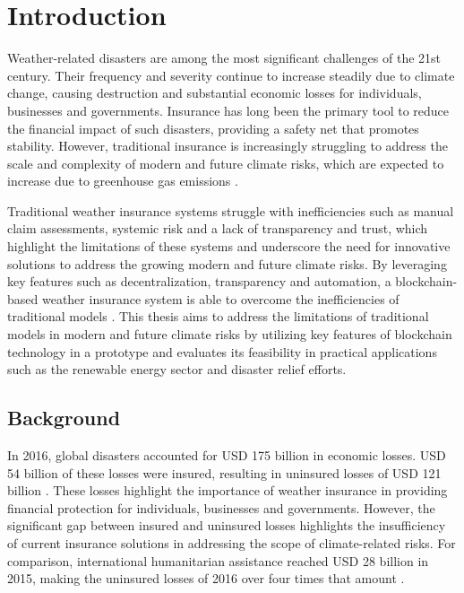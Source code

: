 \chapter{Introduction}\label{chapter:introduction} 
Weather-related disasters are among the most significant challenges of the 21st century. Their frequency and severity continue to increase steadily due to climate change, causing destruction and substantial economic losses for individuals, businesses and governments. Insurance has long been the primary tool to reduce the financial impact of such disasters, providing a safety net that promotes stability. However, traditional insurance is increasingly struggling to address the scale and complexity of modern and future climate risks, which are expected to increase due to greenhouse gas emissions \autocites{van2006impacts}{monasterolo2020climate}{jones2005assessing}.

Traditional weather insurance systems struggle with inefficiencies such as manual claim assessments, systemic risk and a lack of transparency and trust, which highlight the limitations of these systems and underscore the need for innovative solutions to address the growing modern and future climate risks. By leveraging key features such as decentralization, transparency and automation, a blockchain-based weather insurance system is able to overcome the inefficiencies of traditional models \autocites{Salem2021Developing}{Omar2023Blockchain-Based}. This thesis aims to address the limitations of traditional models in modern and future climate risks by utilizing key features of blockchain technology in a prototype and evaluates its feasibility in practical applications such as the renewable energy sector and disaster relief efforts.

\section{Background}\label{section:background}
In 2016, global disasters accounted for USD 175 billion in economic losses. USD 54 billion of these losses were insured, resulting in uninsured losses of USD 121 billion \autocite{swissre2017}. These losses highlight the importance of weather insurance in providing financial protection for individuals, businesses and governments. However, the significant gap between insured and uninsured losses highlights the insufficiency of current insurance solutions in addressing the scope of climate-related risks. For comparison, international humanitarian assistance reached USD 28 billion in 2015, making the uninsured losses of 2016 over four times that amount \autocite{development2016humanitarian}.

